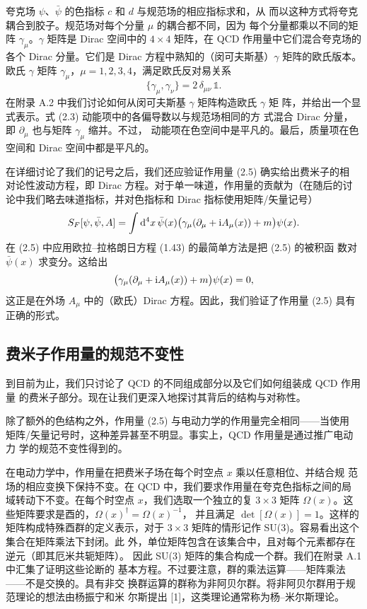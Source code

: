 夸克场 $\psi$、$\bar\psi$ 的色指标 $c$ 和 $d$ 与规范场的相应指标求和，从
而以这种方式将夸克耦合到胶子。规范场对每个分量 $\mu$ 的耦合都不同，因为
每个分量都乘以不同的矩阵 $\gamma_\mu$。$\gamma$ 矩阵是 Dirac 空间中的
$4\times 4$ 矩阵，在 QCD 作用量中它们混合夸克场的各个 Dirac 分量。它们是
Dirac 方程中熟知的（闵可夫斯基）$\gamma$ 矩阵的欧氏版本。欧氏 $\gamma$
矩阵 $\gamma_\mu$，$\mu = 1, 2, 3, 4$，满足欧氏反对易关系
\begin{equation}
  \{\gamma_\mu, \gamma_\nu\} = 2\,\delta_{\mu\nu}\,\mathbb{1} .
\end{equation}
在附录 A.2 中我们讨论如何从闵可夫斯基 $\gamma$ 矩阵构造欧氏 $\gamma$ 矩
阵，并给出一个显式表示。式 (2.3) 动能项中的各偏导数以与规范场相同的方
式混合 Dirac 分量，即 $\partial_\mu$ 也与矩阵 $\gamma_\mu$ 缩并。不过，
动能项在色空间中是平凡的。最后，质量项在色空间和 Dirac 空间中都是平凡的。

在详细讨论了我们的记号之后，我们还应验证作用量 (2.5) 确实给出费米子的相
对论性波动方程，即 Dirac 方程。对于单一味道，作用量的贡献为（在随后的讨
论中我们略去味道指标，并对色指标和 Dirac 指标使用矩阵/矢量记号）
\begin{equation}
  S_F[\psi, \bar\psi, A] = \int \mathrm{d}^4 x\,
    \bar\psi(x) \big(\gamma_\mu (\partial_\mu + \mathrm{i} A_\mu(x)) + m\big)
    \psi(x) .
\end{equation}
在 (2.5) 中应用欧拉--拉格朗日方程 (1.43) 的最简单方法是把 (2.5) 的被积函
数对 $\bar\psi(x)$ 求变分。这给出
\begin{equation}
  \big(\gamma_\mu (\partial_\mu + \mathrm{i} A_\mu(x)) + m\big) \psi(x) = 0 ,
\end{equation}
这正是在外场 $A_\mu$ 中的（欧氏）Dirac 方程。因此，我们验证了作用量 (2.5)
具有正确的形式。

\subsection{费米子作用量的规范不变性}

到目前为止，我们只讨论了 QCD 的不同组成部分以及它们如何组装成 QCD 作用量
的费米子部分。现在让我们更深入地探讨其背后的结构与对称性。

除了额外的色结构之外，作用量 (2.5) 与电动力学的作用量完全相同——当使用
矩阵/矢量记号时，这种差异甚至不明显。事实上，QCD 作用量是通过推广电动力
学的规范不变性得到的。

在电动力学中，作用量在把费米子场在每个时空点 $x$ 乘以任意相位、并结合规
范场的相应变换下保持不变。在 QCD 中，我们要求作用量在夸克色指标之间的局
域转动下不变。在每个时空点 $x$，我们选取一个独立的复 $3 \times 3$ 矩阵
$\Omega(x)$。这些矩阵要求是酉的，$\Omega(x)^\dagger = \Omega(x)^{-1}$，
并且满足 $\det[\Omega(x)] = 1$。这样的矩阵构成特殊酉群的定义表示，对于
$3 \times 3$ 矩阵的情形记作 SU(3)。容易看出这个集合在矩阵乘法下封闭。此
外，单位矩阵包含在该集合中，且对每个元素都存在逆元（即其厄米共轭矩阵）。
因此 SU(3) 矩阵的集合构成一个群。我们在附录 A.1 中汇集了证明这些论断的
基本方程。不过要注意，群的乘法运算——矩阵乘法——不是交换的。具有非交
换群运算的群称为非阿贝尔群。将非阿贝尔群用于规范理论的想法由杨振宁和米
尔斯提出 [1]，这类理论通常称为杨--米尔斯理论。

